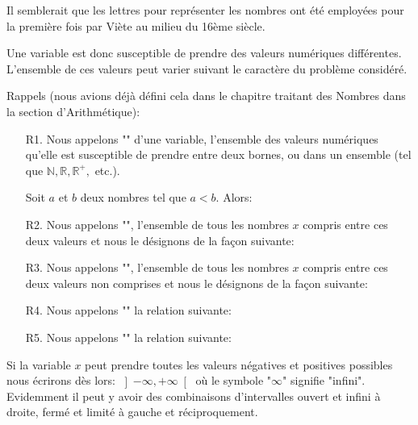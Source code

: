 	\begin{tcolorbox}[title=Remarque,colframe=black,arc=10pt]
	Il semblerait que les lettres pour représenter les nombres ont été employées pour la première fois par Viète au milieu du 16ème siècle.
	\end{tcolorbox}	

	Une variable est donc susceptible de prendre des valeurs numériques différentes. L'ensemble de ces valeurs peut varier suivant le caractère du problème considéré.
	
	Rappels (nous avions déjà défini cela dans le chapitre traitant des Nombres dans la section d'Arithmétique):

	\begin{enumerate}
		\item[R1.] Nous appelons "" d'une variable, l'ensemble des valeurs numériques qu'elle est susceptible de prendre entre deux bornes, ou dans un ensemble (tel que $\mathbb{N}, \mathbb{R},\mathbb{R}^+,$ etc.).
	
	Soit $a$ et $b$ deux nombres tel que $a<b$. Alors:
		
		\item[R2.] Nous appelons "", l'ensemble de tous les nombres $x$ compris entre ces deux valeurs et nous le désignons de la façon suivante:
		
		
		\item[R3.] Nous appelons "", l'ensemble de tous les nombres $x$ compris entre ces deux valeurs non comprises et nous le désignons de la façon suivante:
		
		
		\item[R4.] Nous appelons "" la relation suivante:
		
		
		\item[R5.] Nous appelons "" la relation suivante:
		
	\end{enumerate}

	\begin{tcolorbox}[title=Remarque,colframe=black,arc=10pt]
	Si la variable $x$ peut prendre toutes les valeurs négatives et positives possibles nous écrirons dès lors: $\left] -\infty,+\infty \right[$ où le symbole "$\infty$" signifie "infini". Evidemment il peut y avoir des combinaisons d'intervalles ouvert et infini à droite, fermé et limité à gauche et réciproquement.
	\end{tcolorbox}	

